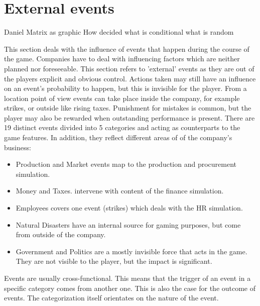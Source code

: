\documentclass[11pt,titlepage,oneside,openany]{book}
\begin{document}
\section{External events}
Daniel
Matrix as graphic
How decided what is conditional what is random


This section deals with the influence of events that happen during the course of the game. Companies have to deal with influencing factors which are neither planned nor foreseeable\cite{Campbell}. This section refers to 'external' events as they are out of the players explicit and obvious control. Actions taken may still have an influence on an event's probability to happen, but this is invisible for the player. From a location point of view events can take place inside the company, for example strikes, or outside like rising taxes. Punishment for mistakes is common, but the player may also be rewarded when outstanding performance is present.  
There are 19 distinct events divided into 5 categories and acting as counterparts to the game features. In addition, they reflect different areas of of the company's business: 

\begin{itemize}
\item Production and Market events map to the production and procurement simulation. 
\item Money and Taxes. intervene with content of the finance simulation.  
\item Employees covers one event (strikes) which deals with the HR simulation.
\item Natural Disasters have an internal source for gaming purposes, but come from outside of the company. 
\item Government and Politics are a mostly invisible force that acts in the game. They are not visible to the player, but the impact is significant. 
\end{itemize}

Events are usually cross-functional. This means that the trigger of an event in a specific category comes from another one. This is also the case for the outcome of events. The categorization itself orientates on the nature of the event.
\end{document}
